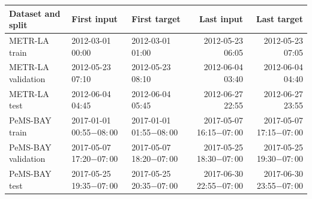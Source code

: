 \begin{tabular}{lllrr}
\toprule
Dataset and split & First input & First target & Last input & Last target\\
\midrule
METR-LA train & 2012-03-01 00:00 & 2012-03-01 01:00 & 2012-05-23 06:05 & 2012-05-23 07:05\\
METR-LA validation & 2012-05-23 07:10 & 2012-05-23 08:10 & 2012-06-04 03:40 & 2012-06-04 04:40\\
METR-LA test & 2012-06-04 04:45 & 2012-06-04 05:45 & 2012-06-27 22:55 & 2012-06-27 23:55\\
PeMS-BAY train & 2017-01-01 00:55$-08{:}00$ & 2017-01-01 01:55$-08{:}00$ & 2017-05-07 16:15$-07{:}00$ & 2017-05-07 17:15$-07{:}00$\\
PeMS-BAY validation & 2017-05-07 17:20$-07{:}00$ & 2017-05-07 18:20$-07{:}00$ & 2017-05-25 18:30$-07{:}00$ & 2017-05-25 19:30$-07{:}00$\\
PeMS-BAY test & 2017-05-25 19:35$-07{:}00$ & 2017-05-25 20:35$-07{:}00$ & 2017-06-30 22:55$-07{:}00$ & 2017-06-30 23:55$-07{:}00$\\
\bottomrule
\end{tabular}

